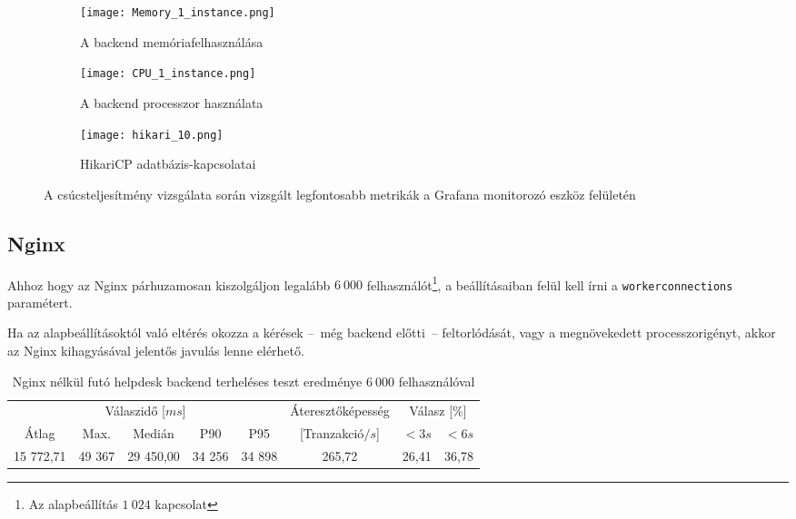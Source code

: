 \begin{figure}[hbt]
	\begin{subfigure}{.95\textwidth}
		\centering
		\texttt{[image: Memory\_1\_instance.png]}  
		\caption{A backend memóriafelhasználása}
		\label{fig:memory_1_instance}

	\end{subfigure}
	\quad

	\begin{subfigure}{.6\textwidth}
		\centering
		\texttt{[image: CPU\_1\_instance.png]}  
		\caption{A backend processzor használata}
		\label{fig:cpu_1_instance}
	\end{subfigure}

	\quad
	\begin{subfigure}{.8\textwidth}
		\centering
		\texttt{[image: hikari\_10.png]}  
		\caption{HikariCP adatbázis-kapcsolatai}
		\label{fig:10_hikari}
	\end{subfigure}
	
	\caption{A csúcsteljesítmény vizsgálata során vizsgált legfontosabb metrikák a Grafana monitorozó eszköz felületén}
	\label{fig:peak_metrics}
\end{figure}

\pagebreak

\subsection{Nginx}
Ahhoz hogy az Nginx párhuzamosan kiszolgáljon legalább $6~000$ felhasználót\footnote{Az alapbeállítás $1~024$ kapcsolat}, a beállításaiban felül kell írni a \mbox{\texttt{worker\textunderscore connections}} paramétert.

Ha az alapbeállításoktól való eltérés okozza a kérések --~még backend előtti~--   feltorlódását, vagy a megnövekedett processzorigényt, akkor az Nginx kihagyásával jelentős javulás lenne elérhető.

\bigskip
\begin{table}[hbt]
	
	\begin{tabular}{ccccc|c|cc}
		\multicolumn{5}{c|}{Válaszidő [$ms$]}  & Áteresztőképesség & \multicolumn{2}{c}{Válasz [\%]}	\\
		Átlag & Max. & Medián & P90 & P95 &	[Tranzakció$/s$] & $<3s$& $<6s$ \\
		\hline 
		15 772,71 &  49 367 & 29 450,00 & 34 256 & 34 898 & 265,72 & 26,41 & 36,78 \\
	\end{tabular} 
	
	\caption{Nginx nélkül futó helpdesk backend terheléses teszt eredménye $6~000$ felhasználóval}
	\label{tabl:without_nginx}
\end{table}

